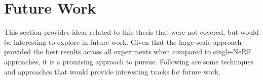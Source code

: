 \begin{comment}
Following the successful implementation of a dataparser for real-world data, we applied our pipeline to data captured from an actual vehicle. Despite operational functionality, the results from the real-world data proved less than optimal. The limitations identified during these experiments are considered crucial factors in explaining these outcomes. Consequently, future work will address these constraints to further refine the performance of the NeRF-based pipeline for real-world applications.

- Pipeline from CARLA to Nerfstudio
    - Enables experimenting with data capture techniques that can later be applied to real world scenarios.
    - Enables running multiple experiments with different experiment settings, e.g. camera setup, vehicle speed, route, image resolution, etc., in a streamlined way.
    - The data output from the experiment-pipeline in CARLA is in a format supported by most NeRFs. Enables training NeRFs on the synthetic data captured in CARLA, and, based on the evaluation of the NeRF, tweak settings to improve the resulting image synthesis.
- A baseline for NeRFs trained on synthetic data captured in CARLA. 
    - Can be used to further improve both the data capture and the NeRF-models on synthetic data.
    - Can be used to experiment with data capture- and NeRF-settings.
    - The metrics used to evaluate the baseline (PSNR, SSIM and LPIPS) are widely used throughout NeRF-research and makes comparable.
- Block-NeRF in Nerfstudio API
    - Creates a naive Block-NeRF implementation in the Nerfstudio API, demonstrating how such an approach can substantially increase the quality of large scene NeRFs.
    - The PoC allows testing which parameters are important when capturing large scale data for NeRFs. E.g. the segment size, overlap between the blocks, image merging techniques.
- Side-by-side view
    - Leverage FFMPEG to create a script for generating side-by-side views of the rendered NeRF and the ground truth.
    - Makes qualitative assessment of the resulting NeRF easier.
\end{comment}

















\section{Future Work}
This section provides ideas related to this thesis that were not covered, but would be interesting to explore in future work. Given that the large-scale approach provided the best results across all experiments when compared to single-NeRF approaches, it is a promising approach to pursue. Following are some techniques and approaches that would provide interesting tracks for future work.

